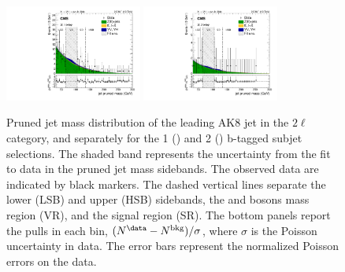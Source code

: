 \begin{figure}[!hbtp]\centering
\includegraphics[width=0.40\textwidth]{B2G-16-003/Figure_001-e.pdf}
\includegraphics[width=0.40\textwidth]{B2G-16-003/Figure_001-f.pdf}

  \caption{
    Pruned jet mass distribution of the leading AK8 jet in the $2\ell$ category, and separately for the 1 (\cmsLeft) and 
2 (\cmsRight) b-tagged subjet selections. The shaded band represents the uncertainty from the fit to data in the pruned jet mass sidebands. 
The observed data are indicated by black markers. The dashed vertical lines separate the lower (LSB) and upper (HSB) sidebands, the \PW and 
\Z bosons mass region (VR), and the signal region (SR). The bottom panels report the pulls in each bin, 
$(N^\text{\data}-N^\text{bkg})/\sigma$, where $\sigma$ is the Poisson uncertainty in data. The error bars represent the normalized Poisson 
errors on the data.
    \label{fig:mJ} }
\end{figure}


